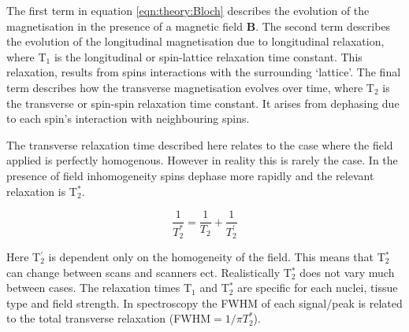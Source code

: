 The first term in equation \ref{eqn:theory:Bloch} describes the evolution of the magnetisation in the presence of a magnetic field $\mathbf{B}$. The second term describes the evolution of the longitudinal magnetisation due to longitudinal relaxation, where T$_1$ is the longitudinal or spin-lattice relaxation time constant. This relaxation, results from spins interactions with the surrounding `lattice'. The final term describes how the transverse magnetisation evolves over time, where T$_2$ is the transverse or spin-spin relaxation time constant. It arises from dephasing due to each spin's interaction with neighbouring spins. 

The transverse relaxation time described here relates to the case where the field applied is perfectly homogenous. However in reality this is rarely the case. In the presence of field inhomogeneity spins dephase more rapidly and the relevant relaxation is T$_2^*$.

\begin{equation}
    \frac{1}{T_2^*} = \frac{1}{T_2} + \frac{1}{T_2^{'}}
    \label{eqn:theory:trans}
\end{equation}

Here T$_2^{'}$ is dependent only on the homogeneity of the field. This means that T$_2^*$ can change between scans and scanners ect. Realistically T$_2^*$ does not vary much between cases. The relaxation times T$_1$ and T$_2^*$ are specific for each nuclei, tissue type and field strength. In spectroscopy the \ac{FWHM} of each signal/peak is related to the total transverse relaxation (\ac{FWHM}$ = 1 / \pi T_2^*$). 


